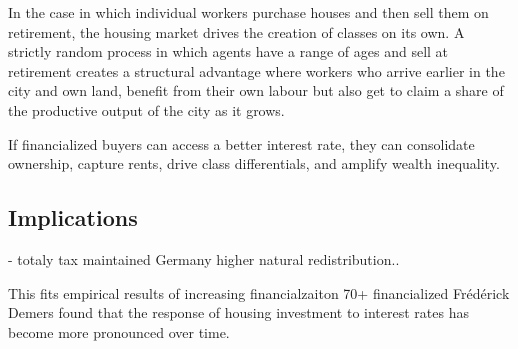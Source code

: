 In the case in which individual workers purchase houses and then sell them on retirement, the housing market drives the creation of classes on its own. A strictly random process in which agents have a range of ages and sell at retirement creates a structural advantage where workers who arrive earlier in the city and own land, benefit from their own labour but also get to claim a share of the productive output of the city as it grows. %

If financialized buyers can access a better interest rate, they can consolidate ownership, capture rents, drive class differentials, and amplify wealth inequality. %


\subsection{Implications}
- totaly tax maintained
Germany higher natural redistribution..

This fits empirical results of increasing financialzaiton 70+ financialized
Fr\'ed\'erick Demers found that the response of housing investment to interest rates has become more pronounced over time. \cite{Demers-bankofcanada-rate-response} %